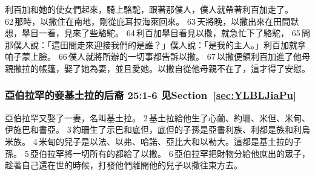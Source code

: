 利百加和她的使女們起來，騎上駱駝，跟著那僕人，僕人就帶著利百加走了。 62 那時，以撒住在南地，剛從庇耳拉海萊回來。 63 天將晚，以撒出來在田間默想，舉目一看，見來了些駱駝。 64 利百加舉目看見以撒，就急忙下了駱駝， 65 問那僕人說：「這田間走來迎接我們的是誰？」僕人說：「是我的主人。」利百加就拿帕子蒙上臉。 66 僕人就將所辦的一切事都告訴以撒。 67 以撒便領利百加進了他母親撒拉的帳篷，娶了她為妻，並且愛她。以撒自從他母親不在了，這才得了安慰。

\subsubsection{亞伯拉罕的妾基土拉的后裔 25:1-6 见Section~\ref{sec:YLBLJiaPu}}
亞伯拉罕又娶了一妻，名叫基土拉。 2 基土拉給他生了心蘭、約珊、米但、米甸、伊施巴和書亞。 3 約珊生了示巴和底但，底但的子孫是亞書利族、利都是族和利烏米族。 4 米甸的兒子是以法、以弗、哈諾、亞比大和以勒大。這都是基土拉的子孫。 5 亞伯拉罕將一切所有的都給了以撒。 6 亞伯拉罕把財物分給他庶出的眾子，趁著自己還在世的時候，打發他們離開他的兒子以撒往東方去。

